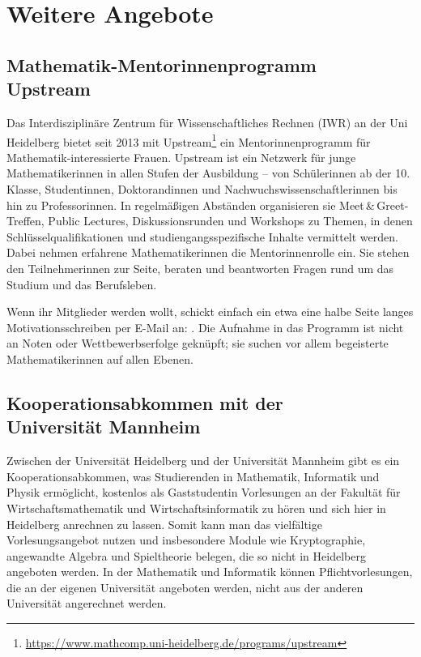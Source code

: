 

\section{Weitere Angebote}

\subsection{Mathematik-Mentorinnenprogramm \\Upstream}
Das Interdisziplinäre Zentrum für Wissenschaftliches Rechnen (IWR) an der Uni Heidelberg bietet seit 2013 mit Upstream\footnote{\url{https://www.mathcomp.uni-heidelberg.de/programs/upstream}} ein Mentorinnenprogramm für Mathematik-interessierte Frauen. Upstream ist ein Netzwerk für junge Mathematikerinnen in allen Stufen der Ausbildung -- von Schülerinnen ab der 10. Klasse, Studentinnen, Doktorandinnen und Nachwuchswissenschaftlerinnen bis hin zu Professorinnen. In regelmäßigen Abständen organisieren sie Meet\,\&\,Greet-Treffen, Public Lectures, Diskussionsrunden und Workshops zu Themen, in denen Schlüsselqualifikationen und studiengangsspezifische Inhalte vermittelt werden. Dabei nehmen erfahrene Mathematikerinnen die Mentorinnenrolle ein. Sie stehen den Teilnehmerinnen zur Seite, beraten und beantworten Fragen rund um das Studium und das Berufsleben.

Wenn ihr Mitglieder werden wollt, schickt einfach ein etwa eine halbe Seite langes Motivationsschreiben per E-Mail an: . Die Aufnahme in das Programm ist nicht an Noten oder Wettbewerbserfolge geknüpft; sie suchen vor allem begeisterte Mathematikerinnen auf allen Ebenen.


\subsection{Kooperationsabkommen mit der \\Universität Mannheim}
Zwischen der Universität Heidelberg und der Universität Mannheim gibt es ein Kooperationsabkommen, was Studierenden in Mathematik, Informatik und Physik ermöglicht, kostenlos als Gaststudentin Vorlesungen an der Fakultät für Wirtschaftsmathematik und Wirtschaftsinformatik zu hören und sich hier in Heidelberg anrechnen zu lassen.
Somit kann man das vielfältige Vorlesungsangebot nutzen und insbesondere Module wie Kryptographie, angewandte Algebra und Spieltheorie belegen, die so nicht in Heidelberg angeboten werden.
In der Mathematik und Informatik können Pflichtvorlesungen, die an der eigenen Universität angeboten werden, nicht aus der anderen Universität angerechnet werden.


